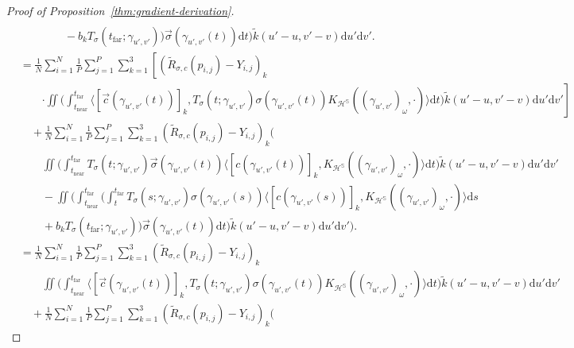 \documentclass{article}
\newcommand{\dif}{\mathrm{d}}
\newcommand{\render}{{R}}
\newcommand{\near}{\mathrm{near}}
\newcommand{\far}{\mathrm{far}}
\begin{document}
\begin{proof}[Proof of Proposition~\ref{thm:gradient-derivation}]
{\begin{align*}
                \\ &\qquad\qquad - b_k T_{\sigma}(t_\far;\gamma_{u',v'})
            \Biggr) \vec{\sigma}(\gamma_{u',v'}(t)) \dif t
        \biggr) \widetilde{k}(u'-u,v'-v) \dif u' \dif v'.
        \\ &= \frac{1}{N} \sum_{i=1}^N \frac{1}{P} \sum_{j=1}^P \sum_{k=1}^3 \left[ ( \widetilde{\render}_{\sigma,c}(p_{i,j}) - Y_{i,j} )_k \right.
            \\ &\qquad \left. \cdot \iint \biggl(
            \int_{t_\near}^{t_\far}
                \langle [\vec{c}(\gamma_{u',v'}(t))]_k, T_{\sigma}(t;\gamma_{u',v'}) \sigma(\gamma_{u',v'}(t)) K_{\mathcal{H}^\mathbb{S}}((\gamma_{u',v'})_\omega, \cdot) \rangle
            \dif t \biggr) \widetilde{k}(u'-u,v'-v) \dif u' \dif v' \right]
        \\ &\quad + \frac{1}{N} \sum_{i=1}^N \frac{1}{P} \sum_{j=1}^P \sum_{k=1}^3 ( \widetilde{\render}_{\sigma,c}(p_{i,j}) - Y_{i,j} )_k \Biggl(
            \\ &\qquad \iint \biggl(
            \int_{t_\near}^{t_\far}
                T_{\sigma}(t;\gamma_{u',v'}) \vec{\sigma}(\gamma_{u',v'}(t))
                \langle [c(\gamma_{u',v'}(t))]_k, K_{\mathcal{H}^\mathbb{S}}((\gamma_{u',v'})_\omega, \cdot) \rangle \dif t \biggr) \widetilde{k}(u'-u,v'-v) \dif u' \dif v'
                \\ &\qquad - \iint \biggl( \int_{t_\near}^{t_\far} \biggl( \int_{t}^{t_\far} T_{\sigma}(s;\gamma_{u',v'})
                \sigma(\gamma_{u',v'}(s))
                \langle [c(\gamma_{u',v'}(s))]_k, K_{\mathcal{H}^\mathbb{S}}((\gamma_{u',v'})_\omega, \cdot) \rangle
                \dif s
                \\ &\qquad + b_k T_{\sigma}(t_\far;\gamma_{u',v'})
            \biggr) \vec{\sigma}(\gamma_{u',v'}(t)) \dif t
        \biggr) \widetilde{k}(u'-u,v'-v) \dif u' \dif v' \Biggr).
        \\ &= \frac{1}{N} \sum_{i=1}^N \frac{1}{P} \sum_{j=1}^P \sum_{k=1}^3 ( \widetilde{\render}_{\sigma,c}(p_{i,j}) - Y_{i,j} )_k
            \\ &\qquad \iint \biggl(
            \int_{t_\near}^{t_\far}
                \langle [\vec{c}(\gamma_{u',v'}(t))]_k, T_{\sigma}(t;\gamma_{u',v'}) \sigma(\gamma_{u',v'}(t)) K_{\mathcal{H}^\mathbb{S}}((\gamma_{u',v'})_\omega, \cdot) \rangle
            \dif t \biggr) \widetilde{k}(u'-u,v'-v) \dif u' \dif v'
        \\ &\quad + \frac{1}{N} \sum_{i=1}^N \frac{1}{P} \sum_{j=1}^P \sum_{k=1}^3 ( \widetilde{\render}_{\sigma,c}(p_{i,j}) - Y_{i,j} )_k \Biggl(

\end{align*}}
\end{proof}
\end{document}
